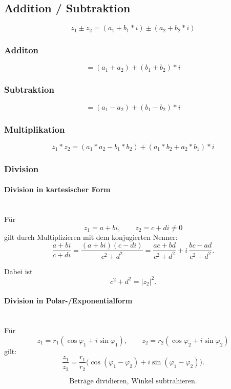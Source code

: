 \documentclass[9pt,a4paper]{article}
\begin{document}
    \subsection{Addition / Subtraktion}
    $$z_1\pm z_2=(a_1+b_1*i)\pm(a_2+b_2*i)$$
    \subsubsection{Additon}
    $$=(a_1+a_2)+(b_1+b_2)*i$$
    \subsubsection{Subtraktion}
    $$=(a_1-a_2)+(b_1-b_2)*i$$
    
    \subsubsection{Multiplikation}
    $$z_1*z_2=(a_1*a_2-b_1*b_2)+(a_1*b_2+a_2*b_1)*i$$
    
    \subsubsection{Division}
    \paragraph{Division in kartesischer Form}\mbox{}\\
    
    Für \[
    z_1 = a+bi,\qquad z_2 = c+di \neq 0
    \]
    gilt durch Multiplizieren mit dem konjugierten Nenner:
    \[
    \frac{a+bi}{c+di}
    =
    \frac{(a+bi)(c-di)}{c^2+d^2}
    =
    \frac{ac+bd}{c^2+d^2}
    +
    i\,\frac{bc-ad}{c^2+d^2}.
    \]
    
    Dabei ist
    \[
    c^2+d^2 = |z_2|^2.
    \]
    
    \paragraph{Division in Polar-/Exponentialform}\mbox{}\\
    
    Für
    \[
    z_1 = r_1(\cos\varphi_1+i\sin\varphi_1), \qquad
    z_2 = r_2(\cos\varphi_2+i\sin\varphi_2)
    \]
    gilt:
    \[
    \frac{z_1}{z_2}
    =
    \frac{r_1}{r_2}
    \Big(\cos(\varphi_1-\varphi_2)+i\sin(\varphi_1-\varphi_2)\Big).
    \]
    
    \[
    \text{Beträge dividieren, Winkel subtrahieren.}
    \]
    
\end{document}
